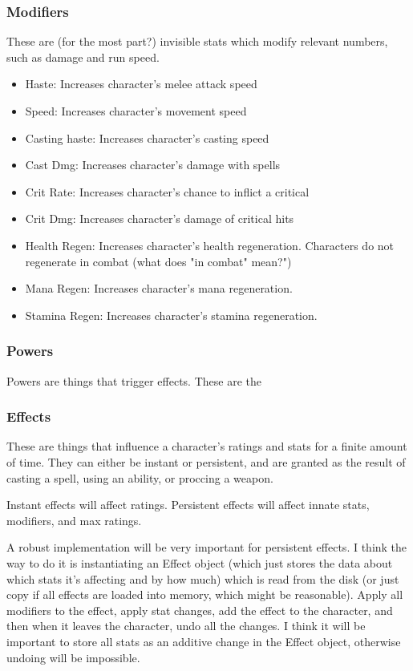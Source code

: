 \documentclass{article}
\begin{document}
\subsubsection{Modifiers}
These are (for the most part?) invisible stats which modify relevant numbers, such as damage and run speed.
\begin{itemize}
    \item Haste: Increases character's melee attack speed
    \item Speed: Increases character's movement speed
    \item Casting haste: Increases character's casting speed
    \item Cast Dmg: Increases character's damage with spells
    \item Crit Rate: Increases character's chance to inflict a critical
    \item Crit Dmg: Increases character's damage of critical hits
    \item Health Regen: Increases character's health regeneration. Characters do not regenerate in combat
    (what does "in combat" mean?")
    \item Mana Regen: Increases character's mana regeneration.
    \item Stamina Regen: Increases character's stamina regeneration.
\end{itemize}

\subsubsection{Powers}
Powers are things that trigger effects. These are the 

\subsubsection{Effects}
These are things that influence a character's ratings and stats for a finite amount of time.
They can either be instant or persistent, and are granted as the result of casting a spell, using an ability,
or proccing a weapon.

Instant effects will affect ratings.
Persistent effects will affect innate stats, modifiers, and max ratings.

A robust implementation will be very important for persistent effects. I think the way
to do it is instantiating
an Effect object (which just stores the data about which stats it's affecting and by how much) which is read
from the disk (or just copy if all effects are loaded into memory, which might be reasonable). Apply all
modifiers to the effect, apply stat changes, add the effect to the character, and then when it leaves the
character, undo all the changes. I think it will be important to store all stats as an additive change in the
Effect object, otherwise undoing will be impossible.
\end{document}
